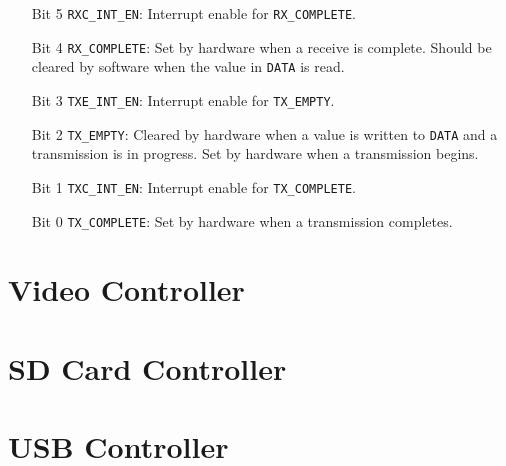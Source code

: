 \documentclass[11pt,openany]{report}
\begin{document}
\begin{enumerate}
\item[Bit 5] \verb|RXC_INT_EN|: Interrupt enable for \verb|RX_COMPLETE|.
\item[Bit 4] \verb|RX_COMPLETE|: Set by hardware when a receive is
  complete. Should be cleared by software when the value in
  \verb|DATA| is read.
\item[Bit 3] \verb|TXE_INT_EN|: Interrupt enable for \verb|TX_EMPTY|.
\item[Bit 2] \verb|TX_EMPTY|: Cleared by hardware when a value is
  written to \verb|DATA| and a transmission is in progress. Set by
  hardware when a transmission begins.
\item[Bit 1] \verb|TXC_INT_EN|: Interrupt enable for \verb|TX_COMPLETE|.
\item[Bit 0] \verb|TX_COMPLETE|: Set by hardware when a transmission
  completes.
\end{enumerate}


\section{Video Controller}

\section{SD Card Controller}

\section{USB Controller}
\end{document}
